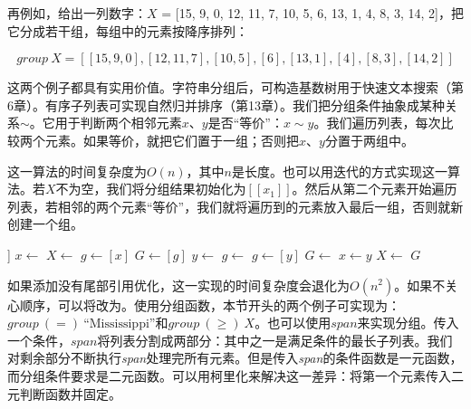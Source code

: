 \documentclass[b5paper]{ctexart}
\begin{document}
再例如，给出一列数字：$X$ = [15, 9, 0, 12, 11, 7, 10, 5, 6, 13, 1, 4, 8, 3, 14, 2]，把它分成若干组，每组中的元素按降序排列：

\[
\textit{group}\ X = [[15, 9, 0], [12, 11, 7], [10, 5], [6], [13, 1], [4], [8, 3], [14, 2]]
\]

这两个例子都具有实用价值。字符串分组后，可构造基数树用于快速文本搜索（第6章）。有序子列表可实现自然归并排序（第13章）。我们把分组条件抽象成某种关系$\sim$。它用于判断两个相邻元素$x$、$y$是否“等价”：$x \sim y$。我们遍历列表，每次比较两个元素。如果等价，就把它们置于一组；否则把$x$、$y$分置于两组中。

\be
{}
\ee

这一算法的时间复杂度为$O(n)$，其中$n$是长度。也可以用迭代的方式实现这一算法。若$X$不为空，我们将分组结果初始化为$[[x_1]]$。然后从第二个元素开始遍历列表，若相邻的两个元素“等价”，我们就将遍历到的元素放入最后一组，否则就新创建一个组。

\begin{algorithmic}[1]
    \State \Return [[\ ]]
  \EndIf
  \State $x \gets$ 
  \State $X \gets$ 
  \State $g \gets [x]$
  \State $G \gets [g]$
    \State $y \gets$ 
      \State $g \gets $ 
    \Else
      \State $g \gets [y]$
      \State $G \gets$ 
    \EndIf
    \State $x \gets y$
    \State $X \gets$ 
  \EndWhile
  \State \Return $G$
\EndFunction
\end{algorithmic}

如果添加没有尾部引用优化，这一实现的时间复杂度会退化为$O(n^2)$。如果不关心顺序，可以将改为。使用分组函数，本节开头的两个例子可实现为：$\textit{group}\ (=)\ \text{``Mississippi''}$和$\textit{group}\ (\geq)\ X$。也可以使用$span$来实现分组。传入一个条件，$span$将列表分割成两部分：其中之一是满足条件的最长子列表。我们对剩余部分不断执行\textit{span}处理完所有元素。但是传入\textit{span}的条件函数是一元函数，而分组条件要求是二元函数。可以用柯里化来解决这一差异：将第一个元素传入二元判断函数并固定。
\end{document}
